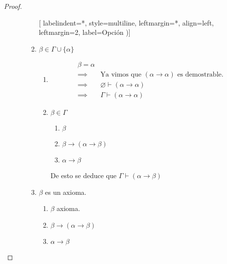 \begin{proof}
\begin{itemize}
\begin{itemize}
                    \begin{enumerate}[%
                                    labelindent=*,
                                    style=multiline,
                                    leftmargin=*,
                                    align=left,
                                    leftmargin=2\parindent,
                                    label=Opción \arabic*)]
                        \item $\beta \in \Gamma\cup \{ \alpha \}$
                            
                        \begin{enumerate}[%
                                        labelindent=*,
                                        style=multiline,
                                        leftmargin=*,
                                        align=left,
                                        leftmargin=2\parindent,
                                        label=Caso \arabic*)]
                        \item \begin{align*}
                            \beta=\alpha & \\
                            \implies& \text{Ya vimos que } (\alpha\to\alpha)
                            \text{ es demostrable.} \\
                            \implies& \varnothing\vdash(\alpha\to\alpha)\\
                            \implies& \Gamma\vdash(\alpha\to\alpha)
                        \end{align*}

                        \item $\beta \in \Gamma$

                        \begin{enumerate}
                            \item $\beta$ %
                            \item $\beta\to(\alpha\to\beta)$%
                            \item $\alpha\to\beta$
                        \end{enumerate}

                        De esto se deduce que $\Gamma\vdash(\alpha\to\beta)$
                        \end{enumerate}

                        \item $\beta$ es un axioma.
                        \begin{enumerate}
                            \item $\beta$ axioma.
                            \item $\beta \to (\alpha\to\beta)$
                            \item $\alpha \to \beta$
                        \end{enumerate}


\end{enumerate}
\end{itemize}
\end{itemize}
\end{proof}
